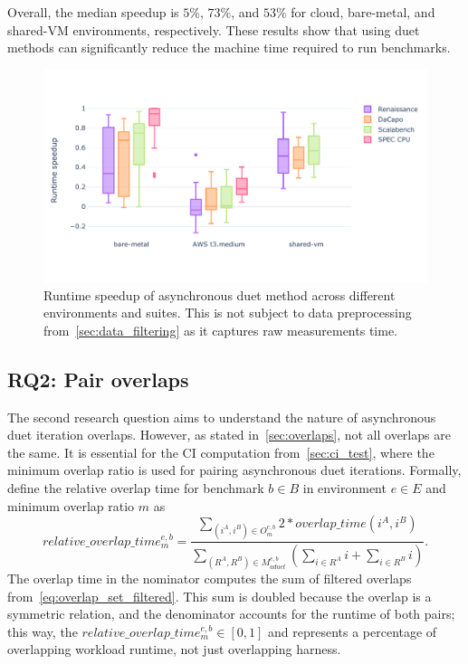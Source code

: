Overall, the median speedup is $5\%$, $73\%$, and $53\%$ for cloud, bare-metal, and shared-VM environments, respectively.
These results show that using duet methods can significantly reduce the machine time required to run benchmarks.

\begin{figure}
	\centering
	\includegraphics[width=.9\linewidth]{./figures/runtime_speedup.pdf}
	\caption{
		Runtime speedup of asynchronous duet method across different environments and suites.
		This is not subject to data preprocessing from~\cref{sec:data_filtering} as it captures raw measurements time.
	}
	\label{fig:runtime_speedup}
\end{figure}

\subsection{RQ2: Pair overlaps}
\label{sec:rq2}

The second research question aims to understand the nature of asynchronous duet iteration overlaps.
However, as stated in~\cref{sec:overlaps}, not all overlaps are the same.
It is essential for the CI computation from~\ref{sec:ci_test}, where the minimum overlap ratio is used for pairing asynchronous duet iterations.
Formally, define the relative overlap time for benchmark $b \in B$ in environment $e \in E$ and minimum overlap ratio $m$ as
\begin{equation}\label{eq:relative_overlap_time}
relative\_overlap\_time^{e, b}_m = \frac{\sum\limits_{(i^A, i^B) \in O^{e,b}_m} 2 * overlap\_time(i^A, i^B)}{\sum\limits_{(R^A, R^B) \in M^{e, b}_{aduet}}\left(\sum\limits_{i \in R^A} i + \sum\limits_{i \in R^B} i\right)}.
\end{equation}
The overlap time in the nominator computes the sum of filtered overlaps from~\cref{eq:overlap_set_filtered}.
This sum is doubled because the overlap is a symmetric relation, and the denominator accounts for the runtime of both pairs; this way, the $relative\_overlap\_time^{e, b}_m \in [0, 1]$ and represents a percentage of overlapping workload runtime, not just overlapping harness.

